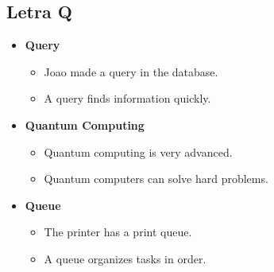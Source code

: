     \subsection{Letra Q}
    \begin{itemize}
        \item \textbf{Query}
        \begin{itemize}
            \item Joao made a query in the database.
            \item A query finds information quickly.
        \end{itemize}
        \item \textbf{Quantum Computing}
        \begin{itemize}
            \item Quantum computing is very advanced.
            \item Quantum computers can solve hard problems.
        \end{itemize}
        \item \textbf{Queue}
        \begin{itemize}
            \item The printer has a print queue.
            \item A queue organizes tasks in order.
        \end{itemize}
    \end{itemize}
